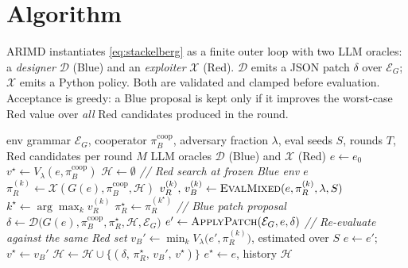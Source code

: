 \documentclass[11pt]{article}
\newcommand{\Egram}{\mathcal{E}_G}
\newcommand{\bluepol}{\pi_B^{\text{coop}}}
\begin{document}
\section{Algorithm}
\label{sec:algorithm}

ARIMD instantiates \eqref{eq:stackelberg} as a finite outer loop
with two LLM oracles: a \emph{designer} $\mathcal{D}$
(Blue) and an \emph{exploiter} $\mathcal{X}$ (Red).
$\mathcal{D}$ emits a JSON patch $\delta$ over $\Egram$;
$\mathcal{X}$ emits a Python policy.  Both are validated and
clamped before evaluation.  Acceptance is greedy: a Blue
proposal is kept only if it improves the worst-case Red value
over \emph{all} Red candidates produced in the round.

\begin{algorithm}[t]
\caption{ARIMD-Stackelberg outer loop}
\label{alg:arimd}
\small
\begin{algorithmic}[1]
\Require env grammar $\Egram$, cooperator $\bluepol$,
         adversary fraction $\lambda$, eval seeds $S$, rounds $T$,
         Red candidates per round $M$
\Require LLM oracles $\mathcal{D}$ (Blue) and $\mathcal{X}$ (Red)
\State $e \gets e_0$ 
\State $v^\star \gets V_\lambda(e, \bluepol)$
\State $\mathcal{H} \gets \emptyset$
  \Statex \hspace*{1.5em}\textit{// Red search at frozen Blue env $e$}
    \State $\pi_R^{(k)} \gets \mathcal{X}(G(e), \bluepol, \mathcal{H})$
    \State $v_R^{(k)},\, v_B^{(k)}
            \gets \textsc{EvalMixed}(e, \pi_R^{(k)}, \lambda, S)$
  \EndFor
  \State $k^\star \gets \arg\max_k v_R^{(k)}$
  \State $\pi_R^\star \gets \pi_R^{(k^\star)}$
  \Statex \hspace*{1.5em}\textit{// Blue patch proposal}
  \State $\delta \gets \mathcal{D}\!\big(G(e), \bluepol,
              \pi_R^\star, \mathcal{H}, \Egram\big)$
  \State $e' \gets \textsc{ApplyPatch}(\Egram, e, \delta)$
  \Statex \hspace*{1.5em}\textit{// Re-evaluate against the same Red set}
  \State $v_B'
          \gets \min_{k} V_\lambda\!\big(e', \pi_R^{(k)}\big)$,
          estimated over $S$
     \State $e \gets e'$;\;\, $v^\star \gets v_B'$
  \EndIf
  \State $\mathcal{H} \gets \mathcal{H} \cup
            \{(\delta,\, \pi_R^\star,\, v_B',\, v^\star)\}$
\EndFor
\State \Return $e^\star \gets e$, history $\mathcal{H}$
\end{algorithmic}
\end{algorithm}
\end{document}
